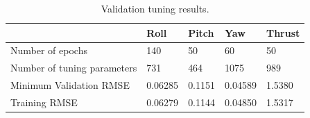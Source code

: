 \begin{table}[H]
\centering
    \begin{tabular}{@{}lllll@{}}
        \toprule
                                      & Roll    & Pitch  & Yaw     & Thrust \\ \midrule
        Number of   epochs            & 140     & 50     & 60      & 50     \\
        Number of   tuning parameters & 731     & 464    & 1075    & 989    \\
        Minimum   Validation RMSE     & 0.06285 & 0.1151 & 0.04589 & 1.5380 \\
        Training RMSE                 & 0.06279 & 0.1144 & 0.04850 & 1.5317 \\ \bottomrule
    \end{tabular}
    \caption{Validation tuning results.}
    \label{tab:results1}
\end{table}
